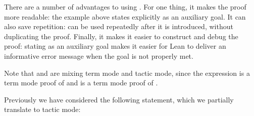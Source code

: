 \documentclass[letterpaper,10pt,english]{sphinxmanual}
\begin{document}
\sphinxAtStartPar
There are a number of advantages to using .
For one thing, it makes the proof more readable:
the example above states  explicitly as an auxiliary goal.
It can also save repetition:
 can be used repeatedly after it is introduced,
without duplicating the proof.
Finally, it makes it easier to construct and debug the proof:
stating  as an auxiliary goal makes it easier for Lean to deliver an
informative error message when the goal is not properly met.

\sphinxAtStartPar
Note that  and  are mixing term mode and tactic mode,
since the expression  is a term mode proof of 
and  is a term mode proof of .

\sphinxAtStartPar
Previously we have considered the following statement,
which we partially translate to tactic mode:

\begin{sphinxVerbatim}[commandchars=\\\{\}]
                  
          
        
         

                   
              
       
\end{sphinxVerbatim}
\end{document}
